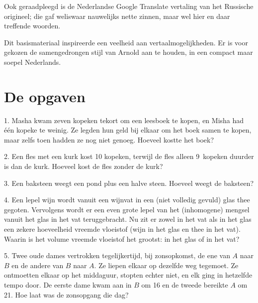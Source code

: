 Ook geraadpleegd is de Nederlandse Google Translate vertaling van het Russische origineel; die gaf weliswaar nauwelijks nette zinnen, maar wel hier en daar treffende woorden.

Dit basismateriaal inspireerde een veelheid aan vertaalmogelijkhe\-den. Er is voor gekozen de samengedrongen stijl van Arnold aan te houden, in een compact maar soepel Nederlands.

\clearpage

\section*{De opgaven}

\begin{problem}{1.}
	Masha kwam zeven kopeken tekort om een leesboek te kopen, en Misha had één kopeke te weinig. Ze legden hun geld bij elkaar om het boek samen te kopen, maar zelfs toen hadden ze nog niet genoeg. Hoeveel kostte het boek?
\end{problem}

\begin{problem}{2.}
	Een fles met een kurk kost 10 kopeken, terwijl de fles alleen 9~kopeken duurder is dan de kurk. Hoeveel kost de fles zonder de kurk?
\end{problem}

\begin{problem}{3.}
	Een baksteen weegt een pond plus een halve steen. Hoeveel weegt de baksteen?
\end{problem}

\begin{problem}{4.}
	Een lepel wijn wordt vanuit een wijnvat in een (niet volledig gevuld) glas thee gegoten. Vervolgens wordt er een even grote lepel van het (inhomogene) mengsel vanuit het glas in het vat teruggebracht. Nu zit er zowel in het vat als in het glas een zekere hoeveelheid vreemde vloeistof (wijn in het glas en thee in het vat). Waarin is het volume vreemde vloeistof het grootst: in het glas of in het vat?
\end{problem}

\begin{problem}{5.}
	Twee oude dames vertrokken tegelijkertijd, bij zonsopkomst, de ene van $A$ naar $B$ en de andere van $B$ naar $A$. Ze liepen elkaar op dezelfde weg tegemoet. Ze ontmoetten elkaar op het middaguur, stopten echter niet, en elk ging in hetzelfde tempo door. De eerste dame kwam aan in $B$ om \SI{16}{\uur} en de tweede bereikte $A$ om \SI{21}{\uur}. Hoe laat was de zonsopgang die dag?
\end{problem}

